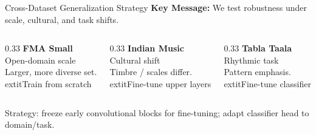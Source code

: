 \documentclass[aspectratio=169,xcolor=dvipsnames]{beamer}
\begin{document}
\begin{frame}{Cross-Dataset Generalization Strategy}
     	\textbf{Key Message:} We test robustness under scale, cultural, and task shifts.\\[6pt]
  \begin{columns}[T,totalwidth=\textwidth]
    \begin{column}{0.33\textwidth}
      {\small \textbf{FMA Small}}\\[-3pt]
      {\tiny Open-domain scale}\\
      Larger, more diverse set.\\
      	extit{Train from scratch}
    \end{column}
    \begin{column}{0.33\textwidth}
      {\small \textbf{Indian Music}}\\[-3pt]
      {\tiny Cultural shift}\\
      Timbre / scales differ.\\
      	extit{Fine-tune upper layers}
    \end{column}
    \begin{column}{0.33\textwidth}
      {\small \textbf{Tabla Taala}}\\[-3pt]
      {\tiny Rhythmic task}\\
      Pattern emphasis.\\
      	extit{Fine-tune classifier}
    \end{column}
  \end{columns}
  \vspace{0.3cm}
  {\tiny Strategy: freeze early convolutional blocks for fine-tuning; adapt classifier head to domain/task.}
\end{frame}
\end{document}
